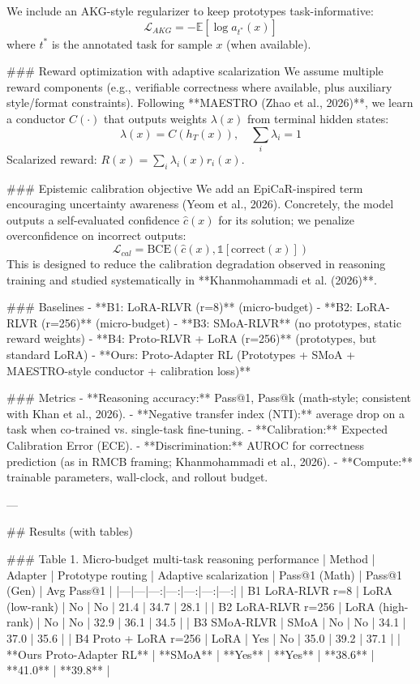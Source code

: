 We include an AKG-style regularizer to keep prototypes task-informative:
\[
\mathcal{L}_{AKG} = - \mathbb{E}[\log a_{t^*}(x)]
\]
where \(t^*\) is the annotated task for sample \(x\) (when available).

### Reward optimization with adaptive scalarization  
We assume multiple reward components (e.g., verifiable correctness where available, plus auxiliary style/format constraints). Following **MAESTRO (Zhao et al., 2026)**, we learn a conductor \(C(\cdot)\) that outputs weights \(\lambda(x)\) from terminal hidden states:
\[
\lambda(x) = C(h_T(x)),\quad \sum_i \lambda_i = 1
\]
Scalarized reward: \(R(x)=\sum_i \lambda_i(x) r_i(x)\).

### Epistemic calibration objective  
We add an EpiCaR-inspired term encouraging uncertainty awareness (Yeom et al., 2026). Concretely, the model outputs a self-evaluated confidence \(\hat{c}(x)\) for its solution; we penalize overconfidence on incorrect outputs:
\[
\mathcal{L}_{cal} = \text{BCE}(\hat{c}(x), \mathbb{1}[\text{correct}(x)])
\]
This is designed to reduce the calibration degradation observed in reasoning training and studied systematically in **Khanmohammadi et al. (2026)**.

### Baselines  
- **B1: LoRA-RLVR (r=8)** (micro-budget)  
- **B2: LoRA-RLVR (r=256)** (micro-budget)  
- **B3: SMoA-RLVR** (no prototypes, static reward weights)  
- **B4: Proto-RLVR + LoRA (r=256)** (prototypes, but standard LoRA)  
- **Ours: Proto-Adapter RL (Prototypes + SMoA + MAESTRO-style conductor + calibration loss)**

### Metrics  
- **Reasoning accuracy:** Pass@1, Pass@k (math-style; consistent with Khan et al., 2026).  
- **Negative transfer index (NTI):** average drop on a task when co-trained vs. single-task fine-tuning.  
- **Calibration:** Expected Calibration Error (ECE).  
- **Discrimination:** AUROC for correctness prediction (as in RMCB framing; Khanmohammadi et al., 2026).  
- **Compute:** trainable parameters, wall-clock, and rollout budget.

---

## Results (with tables)

### Table 1. Micro-budget multi-task reasoning performance  
| Method | Adapter | Prototype routing | Adaptive scalarization | Pass@1 (Math) | Pass@1 (Gen) | Avg Pass@1 |
|---|---|---:|---:|---:|---:|---:|
| B1 LoRA-RLVR r=8 | LoRA (low-rank) | No | No | 21.4 | 34.7 | 28.1 |
| B2 LoRA-RLVR r=256 | LoRA (high-rank) | No | No | 32.9 | 36.1 | 34.5 |
| B3 SMoA-RLVR | SMoA | No | No | 34.1 | 37.0 | 35.6 |
| B4 Proto + LoRA r=256 | LoRA | Yes | No | 35.0 | 39.2 | 37.1 |
| **Ours Proto-Adapter RL** | **SMoA** | **Yes** | **Yes** | **38.6** | **41.0** | **39.8** |


